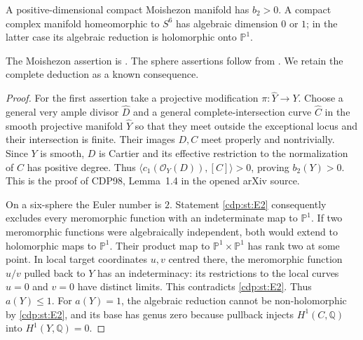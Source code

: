 
\begin{proposition}\label{cdp:st:E3}
A positive-dimensional compact Moishezon manifold has $b_2>0$.
A compact complex manifold homeomorphic to $S^6$ has algebraic
dimension $0$ or $1$; in the latter case its algebraic reduction is
holomorphic onto $\mathbb P^1$.
\end{proposition}

The Moishezon assertion is \citet[Lemma~1.4]{CDP98}. The sphere assertions follow from \citet[Theorem~3.1 and Corollary~3.2, p.~9]{LRS2019}. We retain the complete deduction as a known consequence.

\begin{proof}
For the first assertion take a projective modification
$\pi:\widehat Y\to Y$. Choose a general very ample divisor
$\widehat D$ and a general complete-intersection curve
$\widehat C$ in the smooth projective manifold $\widehat Y$ so that
they meet outside the exceptional locus and their intersection is
finite. Their images $D,C$ meet properly and nontrivially. Since $Y$
is smooth, $D$ is Cartier and its effective restriction to the
normalization of $C$ has positive degree. Thus
$\langle c_1(\mathcal O_Y(D)),[C]\rangle>0$, proving $b_2(Y)>0$.
This is the proof of CDP98, Lemma~1.4 in the opened arXiv source.

On a six-sphere the Euler number is $2$. Statement \ref{cdp:st:E2} consequently
excludes every meromorphic function with an indeterminate map to
$\mathbb P^1$. If two meromorphic functions were algebraically
independent, both would extend to holomorphic maps to
$\mathbb P^1$. Their product map to $\mathbb P^1\times\mathbb P^1$
has rank two at some point. In local target coordinates $u,v$
centred there, the meromorphic function $u/v$ pulled back to $Y$
has an indeterminacy: its restrictions to the local curves
$u=0$ and $v=0$ have distinct limits. This contradicts \ref{cdp:st:E2}.
Thus $a(Y)\leq1$. For $a(Y)=1$, the algebraic reduction cannot be
non-holomorphic by \ref{cdp:st:E2}, and its base has genus zero because pullback
injects $H^1(C,\mathbb Q)$ into $H^1(Y,\mathbb Q)=0$.
\end{proof}


